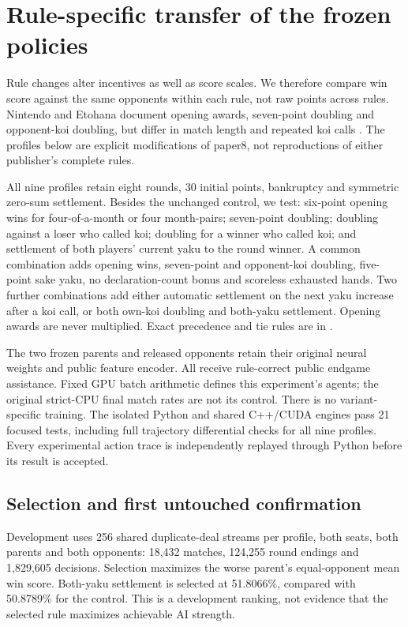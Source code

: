 \section{Rule-specific transfer of the frozen policies}
\label{app:rule-transfer}
Rule changes alter incentives as well as score scales. We therefore compare
win score against the same opponents within each rule, not raw points across
rules. Nintendo and Etohana document opening awards, seven-point doubling and
opponent-koi doubling, but differ in match length and repeated koi calls
\cite{nintendokoikoi,etohanakoikoi}. The profiles below are explicit modifications
of paper8, not reproductions of either publisher's complete rules.

All nine profiles retain eight rounds, 30 initial points, bankruptcy and
symmetric zero-sum settlement. Besides the unchanged control, we test:
six-point opening wins for four-of-a-month or four month-pairs; seven-point
doubling; doubling against a loser who called koi; doubling for a winner who
called koi; and settlement of both players' current yaku to the round winner.
A common combination adds opening wins, seven-point and opponent-koi doubling,
five-point sake yaku, no declaration-count bonus and scoreless exhausted hands.
Two further combinations add either automatic settlement on the next yaku
increase after a koi call, or both own-koi doubling and both-yaku settlement.
Opening awards are never multiplied. Exact precedence and tie rules are in
.

The two frozen parents and released opponents retain their original neural
weights and public feature encoder. All receive rule-correct public endgame
assistance. Fixed GPU batch arithmetic defines this experiment's agents;
the original strict-CPU final match rates are not its control. There is no
variant-specific training. The isolated Python and shared C++/CUDA engines
pass 21 focused tests, including full trajectory differential checks for all
nine profiles. Every experimental action trace is independently replayed
through Python before its result is accepted.

\subsection{Selection and first untouched confirmation}
Development uses 256 shared duplicate-deal streams per profile, both seats,
both parents and both opponents: 18,432 matches, 124,255 round endings and
1,829,605 decisions. Selection maximizes the worse parent's equal-opponent
mean win score. Both-yaku settlement is selected at 51.8066\%, compared with
50.8789\% for the control. This is a development ranking, not evidence that
the selected rule maximizes achievable AI strength.

